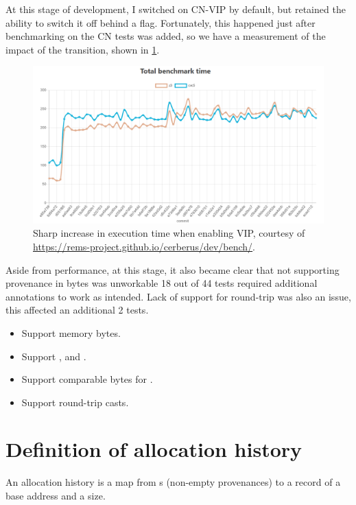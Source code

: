At this stage of development, I switched on CN-VIP by default, but retained the
ability to switch it off behind a flag. Fortunately, this happened just after
benchmarking on the CN tests was added, so we have a measurement of the impact
of the transition, shown in \cref{fig:vip-performance-hit}.

\begin{figure}[h]
    \centering
    \includegraphics[width=\textwidth]{../misc/vip-performance-hit.png}
    \caption{Sharp increase in execution time when enabling VIP, courtesy of
        \url{https://rems-project.github.io/cerberus/dev/bench/}.}\label{fig:vip-performance-hit}
\end{figure}

Aside from performance, at this stage, it also became clear that not supporting
provenance in bytes was unworkable \textemdash{} 18 out of 44 tests required
additional  annotations to work as intended. Lack of
support for round-trip was also an issue, this affected an additional 2 tests.

\begin{itemize}
    \item Support memory bytes.
    \item Support ,  and .
    \item Support comparable bytes for .
    \item Support round-trip casts.
\end{itemize}

\section{Definition of allocation history}

An allocation history is a map from s (non-empty provenances) to a
record of a base address and a size.

